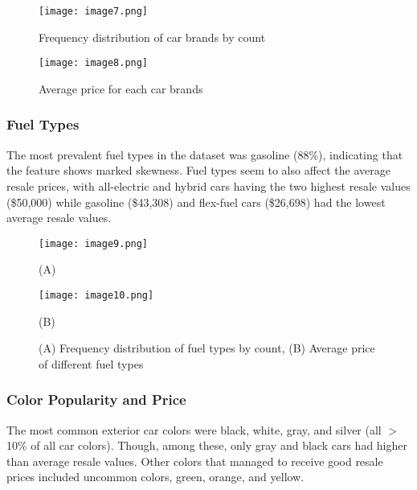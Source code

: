 \documentclass{article}
\begin{document}
\begin{figure}[H]
   \centering
   \texttt{[image: image7.png]}  %
   \caption{Frequency distribution of car brands by count}
   \label{fig:brand_dist}
\end{figure}

\begin{figure}[H]
   \centering
   \texttt{[image: image8.png]}  %
   \caption{Average price for each car brands}
   \label{fig:brand_dist}
\end{figure}

\subsubsection{Fuel Types}

The most prevalent fuel types in the dataset was gasoline (88\%), indicating that the feature shows marked skewness. Fuel types seem to also affect the average resale prices, with all-electric and hybrid cars having the two highest resale values (\$50,000) while gasoline (\$43,308) and flex-fuel cars (\$26,698) had the lowest average resale values.

\begin{figure}[H]    %
   \centering
   \begin{minipage}[b]{0.45\textwidth}
       \centering
       \texttt{[image: image9.png]}
       \centerline{(A)}
   \end{minipage}
   \hfill
   \begin{minipage}[b]{0.45\textwidth}
       \centering
       \texttt{[image: image10.png]}  %
       \centerline{(B)}
   \end{minipage}
   \caption{(A) Frequency distribution of fuel types by count, (B) Average price of different fuel types}
   \label{fig:price_dist}
\end{figure}

\subsubsection{Color Popularity and Price}

The most common exterior car colors were black, white, gray, and silver (all $>$10\% of all car colors). Though, among these, only gray and black cars had higher than average resale values. Other colors that managed to receive good resale prices included uncommon colors, green, orange, and yellow.
\end{document}

